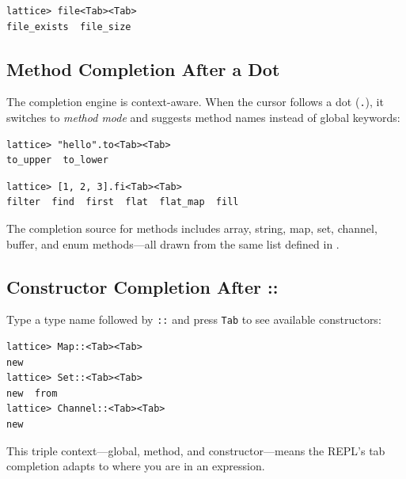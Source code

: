 \begin{lstlisting}[numbers=none]
lattice> file<Tab><Tab>
file_exists  file_size
\end{lstlisting}

\subsection{Method Completion After a Dot}\label{subsec:method-completion}

The completion engine is context-aware.
When the cursor follows a dot (\lstinline|.|), it switches to \emph{method mode} and suggests method names instead of global keywords:

\begin{lstlisting}[numbers=none]
lattice> "hello".to<Tab><Tab>
to_upper  to_lower
\end{lstlisting}

\begin{lstlisting}[numbers=none]
lattice> [1, 2, 3].fi<Tab><Tab>
filter  find  first  flat  flat_map  fill
\end{lstlisting}

The completion source for methods includes array, string, map, set, channel, buffer, and enum methods---all drawn from the same list defined in .

\subsection{Constructor Completion After ::}\label{subsec:constructor-completion}

Type a type name followed by \lstinline|::| and press \texttt{Tab} to see available constructors:

\begin{lstlisting}[numbers=none]
lattice> Map::<Tab><Tab>
new
lattice> Set::<Tab><Tab>
new  from
lattice> Channel::<Tab><Tab>
new
\end{lstlisting}

This triple context---global, method, and constructor---means the REPL's tab completion adapts to where you are in an expression.

